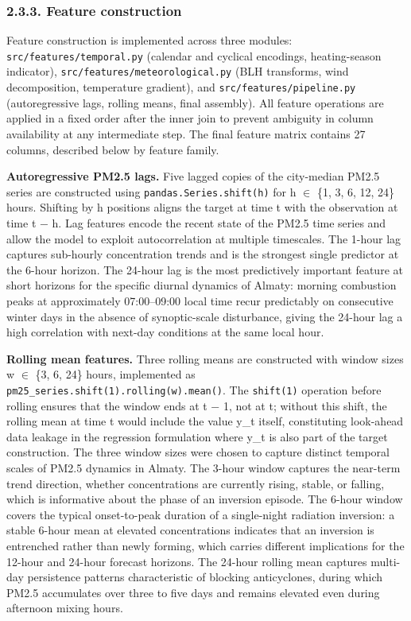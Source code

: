 \subsubsection{2.3.3. Feature construction}\label{feature-construction}

Feature construction is implemented across three modules: \texttt{src/features/temporal.py} (calendar and cyclical encodings, heating-season indicator), \texttt{src/features/meteorological.py} (BLH transforms, wind decomposition, temperature gradient), and \texttt{src/features/pipeline.py} (autoregressive lags, rolling means, final assembly). All feature operations are applied in a fixed order after the inner join to prevent ambiguity in column availability at any intermediate step. The final feature matrix contains 27 columns, described below by feature family.

\textbf{Autoregressive PM2.5 lags.} Five lagged copies of the city-median PM2.5 series are constructed using \texttt{pandas.Series.shift(h)} for h $\in$ \{1, 3, 6, 12, 24\} hours. Shifting by h positions aligns the target at time t with the observation at time t − h. Lag features encode the recent state of the PM2.5 time series and allow the model to exploit autocorrelation at multiple timescales. The 1-hour lag captures sub-hourly concentration trends and is the strongest single predictor at the 6-hour horizon. The 24-hour lag is the most predictively important feature at short horizons for the specific diurnal dynamics of Almaty: morning combustion peaks at approximately 07:00--09:00 local time recur predictably on consecutive winter days in the absence of synoptic-scale disturbance, giving the 24-hour lag a high correlation with next-day conditions at the same local hour.

\textbf{Rolling mean features.} Three rolling means are constructed with window sizes w $\in$ \{3, 6, 24\} hours, implemented as \texttt{pm25\_series.shift(1).rolling(w).mean()}. The \texttt{shift(1)} operation before rolling ensures that the window ends at t − 1, not at t; without this shift, the rolling mean at time t would include the value y\_t itself, constituting look-ahead data leakage in the regression formulation where y\_t is also part of the target construction. The three window sizes were chosen to capture distinct temporal scales of PM2.5 dynamics in Almaty. The 3-hour window captures the near-term trend direction, whether concentrations are currently rising, stable, or falling, which is informative about the phase of an inversion episode. The 6-hour window covers the typical onset-to-peak duration of a single-night radiation inversion: a stable 6-hour mean at elevated concentrations indicates that an inversion is entrenched rather than newly forming, which carries different implications for the 12-hour and 24-hour forecast horizons. The 24-hour rolling mean captures multi-day persistence patterns characteristic of blocking anticyclones, during which PM2.5 accumulates over three to five days and remains elevated even during afternoon mixing hours.

